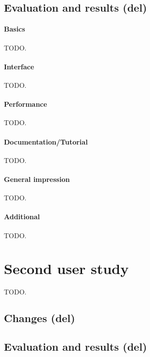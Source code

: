 \subsection{Evaluation and results (del)}
\paragraph{Basics} TODO.
\paragraph{Interface} TODO.
\paragraph{Performance} TODO.
\paragraph{Documentation/Tutorial} TODO.
\paragraph{General impression} TODO.
\paragraph{Additional} TODO.

\section{Second user study}
TODO.
\subsection{Changes (del)}
\subsection{Evaluation and results (del)}